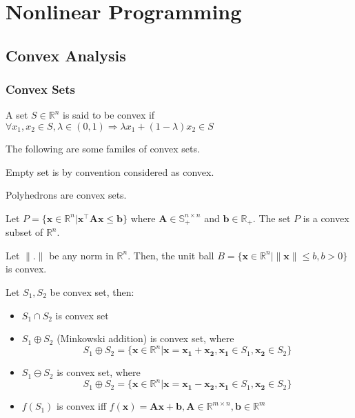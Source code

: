 

\part{Nonlinear Programming}
	\chapter{Convex Analysis}
		\section{Convex Sets}
			\begin{definition}
				A set $S\in \mathbb{R}^n$ is said to be convex if $\forall x_1, x_2 \in S, \lambda \in (0, 1) \Rightarrow \lambda x_1 + (1-\lambda)x_2 \in S$
			\end{definition}

			The following are some familes of convex sets.

			\begin{example}
				Empty set is by convention considered as convex.
			\end{example}

			\begin{example}
				Polyhedrons are convex sets.
			\end{example}

			\begin{example}
				Let $P = \{\mathbf{x}\in \mathbb{R}^n | \mathbf{x}^\top \mathbf{Ax} \le \mathbf{b}\}$ where $\mathbf{A} \in \mathbb{S}_+^{n\times n}$ and $\mathbf{b} \in \mathbb{R}_+$. The set $P$ is a convex subset of $\mathbb{R}^n$.
			\end{example}

			\begin{example}
				Let $\|.\|$ be any norm in $\mathbb{R}^n$. Then, the unit ball $B = \{\mathbf{x} \in \mathbb{R}^n | \|\mathbf{x}\| \le b, b > 0\}$ is convex.
			\end{example}

			Let	$S_1, S_2$ be convex set, then:
			\begin{itemize}
				\item $S_1 \cap S_2$ is convex set
				\item $S_1 \oplus S_2$ (Minkowski addition) is convex set, where
					\begin{equation}
						S_1 \oplus S_2 = \{\mathbf{x} \in \mathbb{R}^n| \mathbf{x} = \mathbf{x_1} + \mathbf{x_2}, \mathbf{x_1} \in S_1, \mathbf{x_2} \in S_2\}
					\end{equation}
				\item $S_1 \ominus S_2$ is convex set, where
					\begin{equation}
						S_1 \oplus S_2 = \{\mathbf{x} \in \mathbb{R}^n| \mathbf{x} = \mathbf{x_1} - \mathbf{x_2}, \mathbf{x_1} \in S_1, \mathbf{x_2} \in S_2\}
					\end{equation}
				\item $f(S_1)$ is convex iff $f(\mathbf{x}) = \mathbf{Ax} + \mathbf{b}, \mathbf{A} \in \mathbb{R}^{m\times n}, \mathbf{b} \in \mathbb{R}^m$
			\end{itemize}

